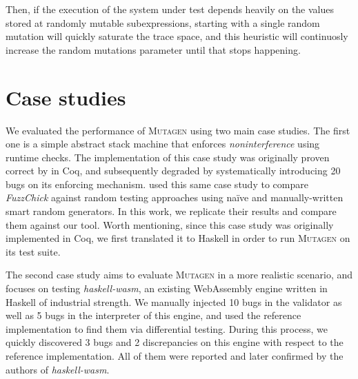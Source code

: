 \documentclass[acmsmall, anonymous]{acmart}
\newcommand{\fuzzchick}{\textit{FuzzChick}\xspace}
\newcommand{\mutagen}{\textsc{Mutagen}\xspace}
\begin{document}
Then, if the execution of the system under test depends heavily on the values
stored at randomly mutable subexpressions, starting with a single random mutation
will quickly saturate the trace space, and this heuristic will continuosly
increase the random mutations parameter until that stops happening.





\section{Case studies}
\label{sec:casestudies}

We evaluated the performance of \mutagen using two main case studies.
%
The first one is a simple abstract stack machine that enforces
\emph{noninterference} using runtime checks.
%
The implementation of this case study was originally proven correct by \cite{}
in Coq, and subsequently degraded by systematically introducing 20 bugs on its
enforcing mechanism.
%
\citeauthor{lampropoulos2019coverage} used this same case study to compare
\fuzzchick against random testing approaches using na\"ive and manually-written
smart random generators.
%
In this work, we replicate their results and compare them against our tool.
%
Worth mentioning, since this case study was originally implemented in Coq, we
first translated it to Haskell in order to run \mutagen on its test suite.


The second case study aims to evaluate \mutagen in a more realistic scenario,
and focuses on testing \textit{haskell-wasm}, an existing WebAssembly engine
written in Haskell of industrial strength.
%
We manually injected 10 bugs in the validator as well as 5 bugs in the
interpreter of this engine, and used the reference implementation to find them
via differential testing.
%
During this process, we quickly discovered 3 bugs and 2 discrepancies on this
engine with respect to the reference implementation.
%
All of them were reported and later confirmed by the authors of
\textit{haskell-wasm}.
\end{document}
